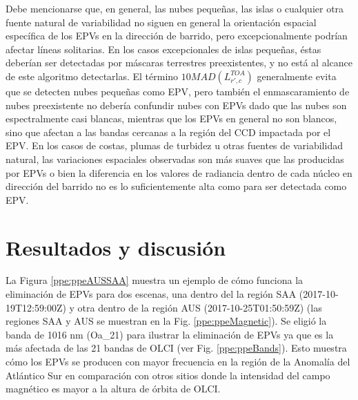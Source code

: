     Debe mencionarse que, en general, las nubes pequeñas, las islas o cualquier otra fuente natural de variabilidad no siguen en general la orientación espacial específica de los EPVs en la dirección de barrido, pero excepcionalmente podrían afectar líneas solitarias.
    En los casos excepcionales de islas pequeñas, éstas deberían ser detectadas por máscaras terrestres preexistentes, y no está al alcance de este algoritmo detectarlas. El término $10 MAD(L^{TOA}_{r',c})$ generalmente evita que se detecten nubes pequeñas como EPV, pero también el enmascaramiento de nubes preexistente no debería confundir nubes con EPVs dado que las nubes son espectralmente casi blancas, mientras que los EPVs en general no son blancos, sino que afectan a las bandas cercanas a la región del CCD impactada por el EPV.
    En los casos de costas, plumas de turbidez u otras fuentes de variabilidad natural, las variaciones espaciales observadas son más suaves que las producidas por EPVs o bien la diferencia en los valores de radiancia dentro de cada núcleo en dirección del barrido no es lo suficientemente alta como para ser detectada como EPV.

\section{Resultados y discusión}
\label{ppe:s:resultados}

    La Figura \ref{ppe:ppeAUSSAA} muestra un ejemplo de cómo funciona la eliminación de EPVs para dos escenas, una dentro del la región SAA (2017-10-19T12:59:00Z) y otra dentro de la región AUS (2017-10-25T01:50:59Z) (las regiones SAA y AUS se muestran en la Fig. \ref{ppe:ppeMagnetic}). Se eligió la banda de 1016 nm (Oa\_21) para ilustrar la eliminación de EPVs ya que es la más afectada de las 21 bandas de OLCI (ver Fig. \ref{ppe:ppeBands}). Esto muestra cómo los EPVs se producen con mayor frecuencia en la región de la Anomalía del Atlántico Sur en comparación con otros sitios donde la intensidad del campo magnético es mayor a la altura de órbita de OLCI.
    
